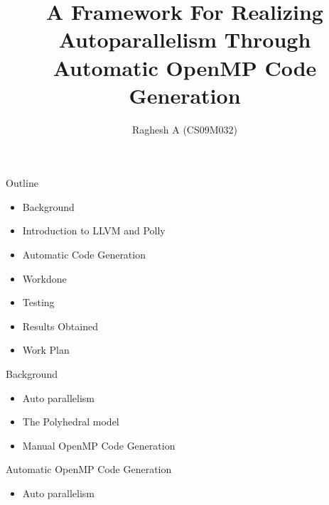 \documentclass{beamer}
\title{A Framework For Realizing Autoparallelism
Through Automatic OpenMP Code Generation
 }
\author{Raghesh A (CS09M032)}
\begin{document}
\begin{frame}
\titlepage
\end{frame}

\begin{frame}{Outline}
\begin{itemize}
\item Background
\item Introduction to LLVM and Polly
\item Automatic Code Generation
\item Workdone
\item Testing
\item Results Obtained
\item Work Plan
\end{itemize}
\end{frame}

\begin{frame}{Background}
\begin{itemize}
\item Auto parallelism
\item The Polyhedral model
\item Manual OpenMP Code Generation
\end{itemize}
\end{frame}

\begin{frame}{Automatic OpenMP Code Generation}
\begin{itemize}
\item Auto parallelism
\end{itemize}
\end{frame}
\end{document}
